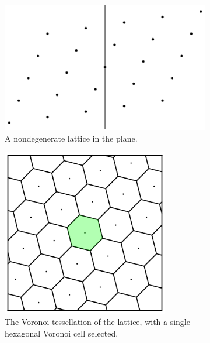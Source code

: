 \documentclass[12pt,twoside]{reedthesis}
\theoremstyle{definition}
\begin{document}
\begin{figure}[h]
  \centering
  \begin{subfigure}[t]{0.45\textwidth}
    \centering
    \includegraphics[width=\textwidth]{figures/subset_homeomorphism_step_1.pdf}
    \caption{A nondegenerate lattice in the plane.}
  \end{subfigure}
  \hfill
  \begin{subfigure}[t]{0.45\textwidth}
    \centering
    \includegraphics[width=0.8\textwidth]{figures/subset_homeomorphism_step_2.pdf}
    \caption{The Voronoi tessellation of the lattice, with a single hexagonal Voronoi cell selected.}
  \end{subfigure}
  \hfill
  \begin{subfigure}[t]{0.45\textwidth}
    \centering

\end{subfigure}
\end{figure}
\end{document}
